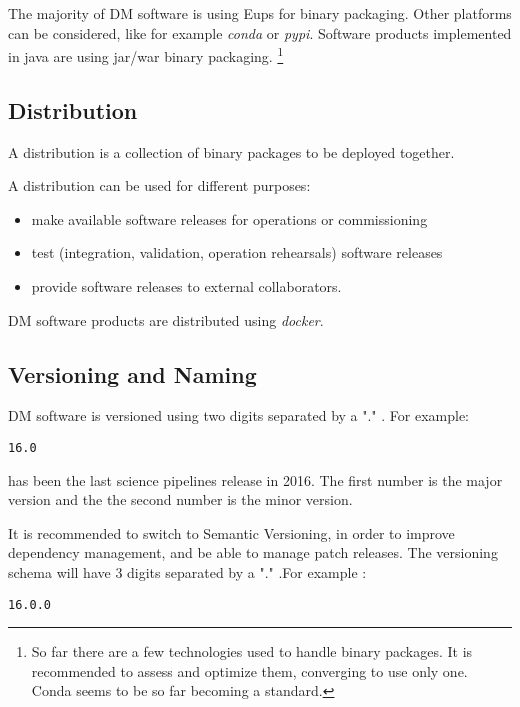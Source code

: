 The majority of DM software is using Eups for binary packaging. Other platforms can be considered, like for example \textit{conda} or \textit{pypi}.
Software products implemented in java are using jar/war binary packaging.
\footnote{So far there are a few technologies used to handle binary packages. It is recommended to assess and optimize them, converging to use only one. 
Conda seems to be so far becoming a standard.}

\subsection{Distribution} \label{sect:distribution}

A distribution is a collection of binary packages to be deployed together.

A distribution can be used for different purposes:

\begin{itemize}
\item make available software releases for operations or commissioning
\item test (integration, validation, operation rehearsals) software releases
\item provide software releases to external collaborators.
\end{itemize}

DM software products are distributed using \textit{docker}.


\newpage
\subsection{Versioning and Naming} \label{sect:versioning}

DM software is versioned using two digits separated by a "." .
For example:

\begin{verbatim}
16.0
\end{verbatim}

has been the last science pipelines release in 2016. The first number is the major version and the the second number is the minor version. 


It is recommended to switch to Semantic Versioning, in order to improve dependency management, and be able to manage patch releases.
The versioning schema will have 3 digits separated by a "." .For example :

\begin{verbatim}
16.0.0
\end{verbatim}



